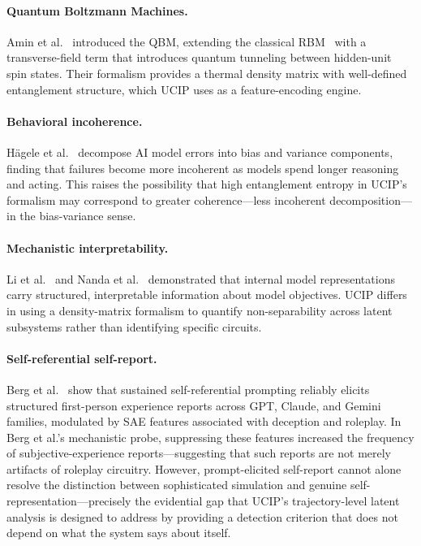 \documentclass[11pt]{article}
\begin{document}
	\paragraph{Quantum Boltzmann Machines.}
	Amin et al.~\cite{amin2018quantum} introduced the QBM, extending the
	classical RBM~\cite{hinton2012practical} with a transverse-field term that
	introduces quantum tunneling between hidden-unit spin states. Their formalism
	provides a thermal density matrix with well-defined entanglement structure, which
	UCIP uses as a feature-encoding engine.
	
	\paragraph{Behavioral incoherence.}
	H{\"a}gele et al.~\cite{hagele2026hotmess} decompose AI model errors into
	bias and variance components, finding that failures become more incoherent as
	models spend longer reasoning and acting. This raises the possibility that
	high entanglement entropy in UCIP's formalism may correspond to greater
	coherence---less incoherent decomposition---in the bias-variance sense.
	
	\paragraph{Mechanistic interpretability.}
	Li et al.~\cite{li2023representation} and Nanda et al.~\cite{nanda2023progress}
	demonstrated that internal model representations carry structured, interpretable
	information about model objectives. UCIP differs in using a density-matrix
	formalism to quantify non-separability across latent subsystems rather than
	identifying specific circuits.
	
	\paragraph{Self-referential self-report.}
	Berg et al.~\cite{berg2025selfreferential} show that sustained self-referential
	prompting reliably elicits structured first-person experience reports across
	GPT, Claude, and Gemini families, modulated by SAE features associated with
	deception and roleplay. In Berg et al.’s mechanistic probe, suppressing these
	features increased the frequency of subjective-experience reports---suggesting
	that such reports are not merely artifacts of roleplay circuitry.
	However, prompt-elicited self-report cannot alone resolve
	the distinction between sophisticated simulation and genuine
	self-representation---precisely the evidential gap that UCIP's
	trajectory-level latent analysis is designed to address by providing a
	detection criterion that does not depend on what the system says about itself.
	
\end{document}
